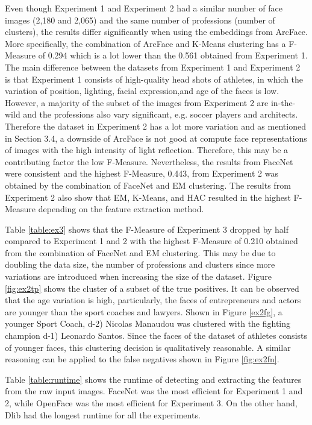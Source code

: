 \documentclass[12pt,english]{article}
\begin{document}
Even though Experiment 1 and Experiment 2 had a similar number of face images (2,180 and 2,065) and the same number of professions (number of clusters), the results differ significantly when using the embeddings from ArcFace. More specifically, the combination of ArcFace and K-Means clustering has a F-Measure of 0.294 which is a lot lower than the 0.561 obtained from Experiment 1. The main difference between the datasets from Experiment 1 and Experiment 2 is that Experiment 1 consists of high-quality head shots of athletes, in which the variation of position, lighting, facial expression,and age of the faces is low. However, a majority of the subset of the images from Experiment 2 are in-the-wild and the professions also vary significant, e.g. soccer players and architects. Therefore the dataset in Experiment 2 has a lot more variation and as mentioned in Section 3.4, a downside of ArcFace is not good at compute face representations of images with the high intensity of light reflection. Therefore, this may be a contributing factor the low F-Measure. Nevertheless, the results from FaceNet were consistent and the highest F-Measure, 0.443, from Experiment 2 was obtained by the combination of FaceNet and EM clustering. The results from Experiment 2 also show that EM, K-Means, and HAC resulted in the highest F-Measure depending on the feature extraction method. 

Table \ref{table:ex3} shows that the F-Measure of Experiment 3 dropped by half compared to Experiment 1 and 2 with the highest F-Measure of 0.210 obtained from the combination of FaceNet and EM clustering. This may be due to doubling the data size, the number of professions and clusters since more variations are introduced when increasing the size of the dataset. Figure \ref{fig:ex2tp} shows the cluster of a subset of the true positives. It can be observed that the age variation is high, particularly, the faces of entrepreneurs and actors are younger than the sport coaches and lawyers. Shown in Figure \ref{ex2fg}, a younger Sport Coach, d-2) Nicolas Manaudou  was clustered with the fighting champion d-1) Leonardo Santos. Since the faces of the dataset of athletes consists of younger faces, this clustering decision is qualitatively reasonable. A similar reasoning can be applied to the false negatives shown in Figure \ref{fig:ex2fn}.

Table \ref{table:runtime} shows the runtime of detecting and extracting the features from the raw input images. FaceNet was the most efficient for Experiment 1 and 2, while OpenFace was the most efficient for Experiment 3. On the other hand, Dlib had the longest runtime for all the experiments.
\end{document}
